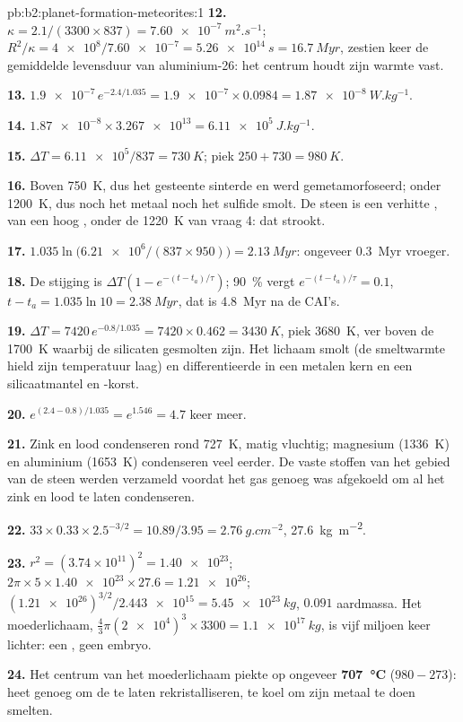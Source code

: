 \begin{solution}{pb:b2:planet-formation-meteorites:1}
\textbf{12.} $\kappa = 2.1/(3300\times837) = \qty{7.60e-7}{m^2.s^{-1}}$;
$R^2/\kappa = \num{4e8}/\num{7.60e-7} = \qty{5.26e14}{s} = \qty{16.7}{Myr}$, zestien
keer de gemiddelde levensduur van aluminium-26: het centrum houdt zijn warmte vast.

\textbf{13.} $\num{1.9e-7}\,e^{-2.4/1.035} = \num{1.9e-7}\times0.0984 =
\qty{1.87e-8}{W.kg^{-1}}$.

\textbf{14.} $\num{1.87e-8}\times\num{3.267e13} = \qty{6.11e5}{J.kg^{-1}}$.

\textbf{15.} $\Delta T = \num{6.11e5}/837 = \qty{730}{K}$; piek
$250 + 730 = \qty{980}{K}$.

\textbf{16.} Boven \qty{750}{K}, dus het gesteente sinterde en werd gemetamorfoseerd; onder
\qty{1200}{K}, dus noch het metaal noch het sulfide smolt. De steen is een verhitte ,
van een hoog , onder de \qty{1220}{K} van vraag 4: dat strookt.

\textbf{17.} $1.035\ln\bigl(\num{6.21e6}/(837\times950)\bigr) = \qty{2.13}{Myr}$:
ongeveer \qty{0.3}{Myr} vroeger.

\textbf{18.} De stijging is $\Delta T(1 - e^{-(t - t_a)/\tau})$; \qty{90}{\percent}
vergt $e^{-(t - t_a)/\tau} = 0.1$, $t - t_a = 1.035\ln10 = \qty{2.38}{Myr}$, dat is
\qty{4.8}{Myr} na de CAI's.

\textbf{19.} $\Delta T = 7420\,e^{-0.8/1.035} = 7420\times0.462 = \qty{3430}{K}$,
piek \qty{3680}{K}, ver boven de \qty{1700}{K} waarbij de silicaten gesmolten zijn.
Het lichaam smolt (de smeltwarmte hield zijn temperatuur laag) en
differentieerde in een metalen kern en een silicaatmantel en -korst.

\textbf{20.} $e^{(2.4 - 0.8)/1.035} = e^{1.546} = 4.7$ keer meer.

\textbf{21.} Zink en lood condenseren rond \qty{727}{K}, matig vluchtig; magnesium
(\qty{1336}{K}) en aluminium (\qty{1653}{K}) condenseren veel eerder. De vaste stoffen van
het gebied van de steen werden verzameld voordat het gas genoeg was afgekoeld om al het zink en
lood te laten condenseren.

\textbf{22.} $33\times0.33\times2.5^{-3/2} = 10.89/3.95 = \qty{2.76}{g.cm^{-2}}$,
\qty{27.6}{kg.m^{-2}}.

\textbf{23.} $r^2 = (3.74\times10^{11})^2 = \num{1.40e23}$;
$2\pi\times5\times\num{1.40e23}\times27.6 = \num{1.21e26}$;
$(\num{1.21e26})^{3/2}/\num{2.443e15} = \qty{5.45e23}{kg}$, $0.091$ aardmassa.
Het moederlichaam, $\tfrac43\pi(\num{2e4})^3\times3300 = \qty{1.1e17}{kg}$, is vijf
miljoen keer lichter: een , geen embryo.

\textbf{24.} Het centrum van het moederlichaam piekte op ongeveer
\textbf{\qty[text-series-to-math=true]{707}{\degreeCelsius}} ($980 - 273$): heet genoeg om
de  te laten rekristalliseren, te koel om zijn metaal te doen smelten.
\end{solution}
